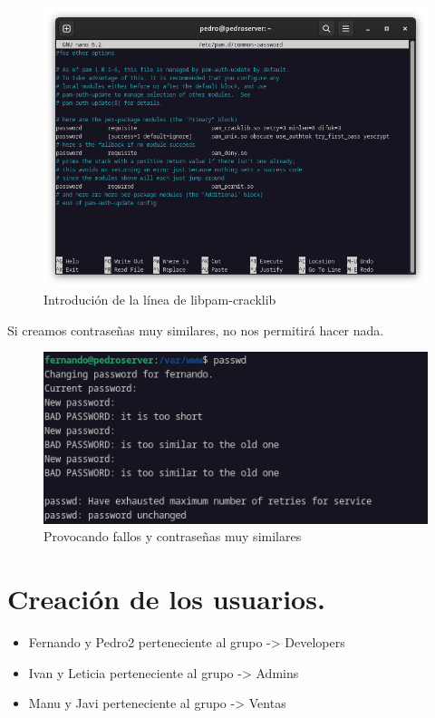 \begin{figure}[H]
	\centering
	\includegraphics[scale=0.30]{02}
	\caption{Introdución de la línea de libpam-cracklib}
\end{figure}

Si creamos contraseñas muy similares, no nos permitirá hacer nada.

\begin{figure}[H]
	\centering
	\includegraphics[scale=0.30]{05}
	\caption{Provocando fallos y contraseñas muy similares}
\end{figure}

\newpage
\section{Creación de los usuarios.}

\begin{itemize}
\item Fernando y Pedro2 perteneciente al grupo -> Developers
\item Ivan y Leticia perteneciente al grupo -> Admins
\item Manu y Javi perteneciente al grupo -> Ventas
\end{itemize}
    
